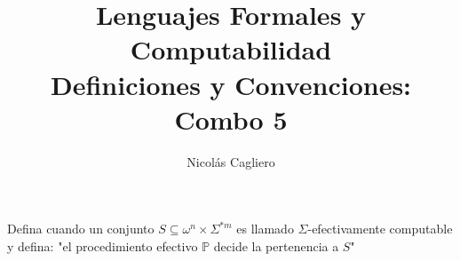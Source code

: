 \documentclass{article}
\title{Lenguajes Formales y Computabilidad \\
        \large Definiciones y Convenciones: Combo 5 }
\author{Nicolás Cagliero}
\begin{document}
\maketitle

Defina cuando un conjunto $S \subseteq \omega^n \times \Sigma^{*m}$
es llamado $\Sigma$-efectivamente computable y defina: "el procedimiento
efectivo $\mathbb{P}$ decide la pertenencia a $S$"
\end{document}

